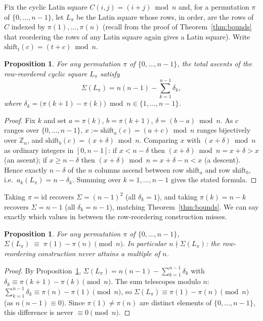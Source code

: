 \documentclass[11pt]{amsart}
\newtheorem{proposition}[theorem]{Proposition}
\begin{document}
Fix the cyclic Latin square $C(i,j)=(i+j)\bmod n$ and, for a permutation $\pi$ of $\{0,\dots,n-1\}$, let $L_\pi$ be the Latin square whose rows, in order, are the rows of $C$ indexed by $\pi(1),\dots,\pi(n)$ (recall from the proof of Theorem~\ref{thm:bounds} that reordering the rows of any Latin square again gives a Latin square). Write $\mathrm{shift}_t(c)=(t+c)\bmod n$.

\begin{proposition}\label{prop:reorder}
For any permutation $\pi$ of $\{0, \dots, n-1\}$, the total ascents of the row-reordered cyclic square $L_\pi$ satisfy
\[
\Sigma(L_\pi) = n(n-1) - \sum_{k=1}^{n-1} \delta_k,
\]
where $\delta_k = \bigl(\pi(k+1) - \pi(k)\bigr) \bmod n \in \{1, \dots, n-1\}$.
\end{proposition}
\begin{proof}
Fix $k$ and set $a=\pi(k)$, $b=\pi(k+1)$, $\delta=(b-a)\bmod n$. As $c$ ranges over $\{0,\dots,n-1\}$, $x:=\mathrm{shift}_a(c)=(a+c)\bmod n$ ranges bijectively over $\mathbb Z_n$, and $\mathrm{shift}_b(c)=(x+\delta)\bmod n$. Comparing $x$ with $(x+\delta)\bmod n$ as ordinary integers in $[0,n-1]$: if $x<n-\delta$ then $(x+\delta)\bmod n=x+\delta>x$ (an ascent); if $x\ge n-\delta$ then $(x+\delta)\bmod n=x+\delta-n<x$ (a descent). Hence exactly $n-\delta$ of the $n$ columns ascend between row $\mathrm{shift}_a$ and row $\mathrm{shift}_b$, i.e.\ $a_k(L_\pi)=n-\delta_k$. Summing over $k=1,\dots,n-1$ gives the stated formula.
\end{proof}

Taking $\pi=\mathrm{id}$ recovers $\Sigma=(n-1)^2$ (all $\delta_k=1$), and taking $\pi(k)=n-k$ recovers $\Sigma=n-1$ (all $\delta_k=n-1$), matching Theorem~\ref{thm:bounds}. We can say exactly which values in between the row-reordering construction misses.

\begin{proposition}\label{prop:gap-exact}
For any permutation $\pi$ of $\{0,\dots,n-1\}$, $\Sigma(L_\pi) \;\equiv\; \pi(1)-\pi(n) \pmod n .$
In particular $n\nmid\Sigma(L_\pi)$: the row-reordering construction never attains a multiple of $n$.
\end{proposition}

\begin{proof}
By Proposition~\ref{prop:reorder}, $\Sigma(L_\pi)=n(n-1)-\sum_{k=1}^{n-1}\delta_k$ with $\delta_k\equiv\pi(k+1)-\pi(k)\pmod n$. The sum telescopes modulo $n$: $\sum_{k=1}^{n-1}\delta_k\equiv\pi(n)-\pi(1)\pmod n$, so $\Sigma(L_\pi)\equiv\pi(1)-\pi(n)\pmod n$ (as $n(n-1)\equiv0$). Since $\pi(1)\ne\pi(n)$ are distinct elements of $\{0,\dots,n-1\}$, this difference is never $\equiv0\pmod n$.
\end{proof}
\end{document}
